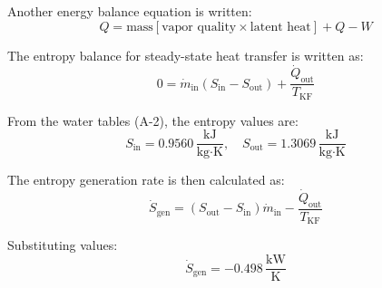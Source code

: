 Another energy balance equation is written:  
\[
Q = \text{mass} \left[ \text{vapor quality} \times \text{latent heat} \right] + Q - W
\]

The entropy balance for steady-state heat transfer is written as:  
\[
0 = \dot{m}_{\text{in}} \left( S_{\text{in}} - S_{\text{out}} \right) + \frac{\dot{Q}_{\text{out}}}{T_{\text{KF}}}
\]  

From the water tables (A-2), the entropy values are:  
\[
S_{\text{in}} = 0.9560 \, \frac{\text{kJ}}{\text{kg·K}}, \quad S_{\text{out}} = 1.3069 \, \frac{\text{kJ}}{\text{kg·K}}
\]  

The entropy generation rate is then calculated as:  
\[
\dot{S}_{\text{gen}} = \left( S_{\text{out}} - S_{\text{in}} \right) \dot{m}_{\text{in}} - \frac{\dot{Q}_{\text{out}}}{T_{\text{KF}}}
\]  

Substituting values:  
\[
\dot{S}_{\text{gen}} = -0.498 \, \frac{\text{kW}}{\text{K}}
\]